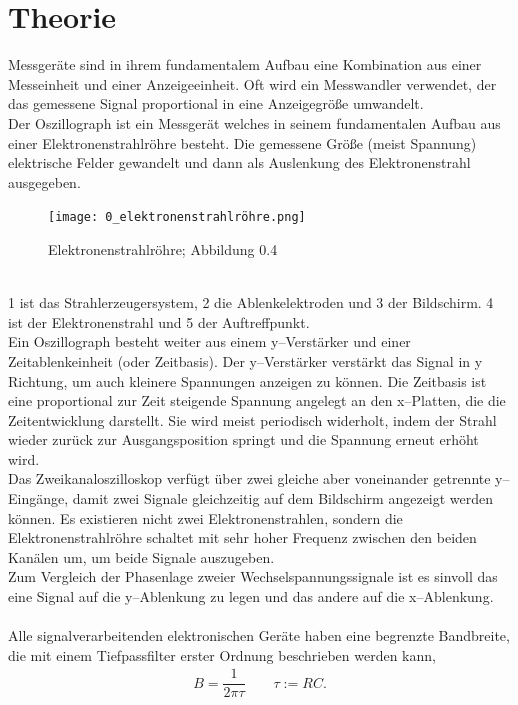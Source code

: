 \documentclass[a4paper,12pt]{article}
\numberwithin{equation}{section}
\begin{document}
\section{Theorie}
Messgeräte sind in ihrem fundamentalem Aufbau eine Kombination aus einer Messeinheit und einer Anzeigeeinheit.
Oft wird ein Messwandler verwendet, der das gemessene Signal proportional in eine Anzeigegröße umwandelt.
\\\indent Der Oszillograph ist ein Messgerät welches in seinem fundamentalen Aufbau aus einer Elektronenstrahlröhre besteht.
Die gemessene Größe (meist Spannung) elektrische Felder gewandelt und dann als Auslenkung des Elektronenstrahl ausgegeben.
\begin{figure}[h]
        \centering
        \texttt{[image: 0\_elektronenstrahlröhre.png]}
        \caption{Elektronenstrahlröhre; Abbildung 0.4 \cite{Praktikumsanleitung}}
\end{figure}\\
1 ist das Strahlerzeugersystem, 2 die Ablenkelektroden und 3 der Bildschirm. 4 ist der Elektronenstrahl und 5 der Auftreffpunkt.
\\\indent Ein Oszillograph besteht weiter aus einem y--Verstärker und einer Zeitablenkeinheit (oder Zeitbasis).
Der y--Verstärker verstärkt das Signal in y Richtung, um auch kleinere Spannungen anzeigen zu können.
Die Zeitbasis ist eine proportional zur Zeit steigende Spannung angelegt an den x--Platten, die die Zeitentwicklung darstellt.
Sie wird meist periodisch widerholt, indem der Strahl wieder zurück zur Ausgangsposition springt und die Spannung erneut erhöht wird.
\\\indent Das Zweikanaloszilloskop verfügt über zwei gleiche aber voneinander getrennte y--Eingänge, damit zwei Signale gleichzeitig auf dem Bildschirm angezeigt werden können.
Es existieren nicht zwei Elektronenstrahlen, sondern die Elektronenstrahlröhre schaltet mit sehr hoher Frequenz zwischen den beiden Kanälen um, um beide Signale auszugeben.
\\\indent Zum Vergleich der Phasenlage zweier Wechselspannungssignale ist es sinvoll das eine Signal auf die y--Ablenkung zu legen und das andere auf die x--Ablenkung.
\\\\
Alle signalverarbeitenden elektronischen Geräte haben eine begrenzte Bandbreite, die mit einem Tiefpassfilter erster Ordnung beschrieben werden kann,
\begin{align} 
        B=\dfrac{1}{2\pi \tau }\qquad \tau :=RC
.\end{align} 
\end{document}
